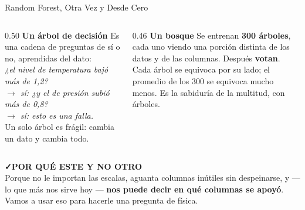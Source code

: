 \documentclass[aspectratio=169, 11pt]{beamer}
\begin{document}
\begin{frame}[shrink=8]{Random Forest, Otra Vez y Desde Cero}
  \vspace{-4pt}
  \begin{columns}[T]
    \begin{column}{0.50\textwidth}
      {\small\color{arcaDark}\bfseries\faTree\hspace{5pt}Un árbol de decisión}
      \vspace{4pt}
      {\footnotesize\color{textMuted}
      Es una cadena de preguntas de sí o no, aprendidas del dato:\\[4pt]
      \textit{¿el nivel de temperatura bajó más de 1{,}2? \\
      $\rightarrow$ sí: ¿y el de presión subió más de 0{,}8? \\
      $\rightarrow$ sí: esto es una falla.}\\[5pt]
      Un solo árbol es frágil: cambia un dato y cambia todo.}
    \end{column}
    \begin{column}{0.46\textwidth}
      {\small\color{arcaDark}\bfseries\faUsers\hspace{5pt}Un bosque}
      \vspace{4pt}
      {\footnotesize\color{textMuted}
      Se entrenan \textbf{300 árboles}, cada uno viendo una porción distinta
      de los datos y de las columnas. Después \textbf{votan}.\\[5pt]
      Cada árbol se equivoca por su lado; el promedio de los 300 se equivoca
      mucho menos. Es la sabiduría de la multitud, con árboles.}
    \end{column}
  \end{columns}
  \vspace{8pt}
  \begin{tcolorbox}[colback=arcaGray, colframe=codeGreen, boxrule=0pt, leftrule=3pt,
    arc=3pt, left=8pt, right=8pt, top=5pt, bottom=5pt]
    {\scriptsize\color{codeGreen}\bfseries\faCheck\hspace{4pt}POR QUÉ ESTE Y NO OTRO}\\[4pt]
    {\scriptsize\color{textMuted}
     Porque no le importan las escalas, aguanta columnas inútiles sin
     despeinarse, y --- lo que más nos sirve hoy --- \textbf{nos puede decir
     en qué columnas se apoyó}. Vamos a usar eso para hacerle una pregunta
     de física.}
  \end{tcolorbox}
\end{frame}
\end{document}
